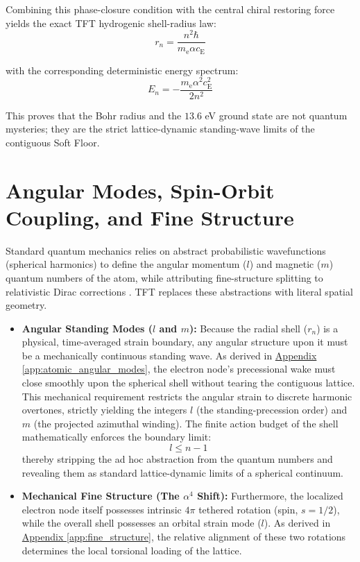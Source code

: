 Combining this phase-closure condition with the central chiral restoring force yields the exact TFT hydrogenic shell-radius law:
\begin{equation}
    r_n = \frac{n^2 \hbar}{m_{\mathrm{e}} \alpha c_{\mathrm{E}}}
\end{equation}

with the corresponding deterministic energy spectrum:
\begin{equation}
    E_n = -\frac{m_{\mathrm{e}} \alpha^2 c_{\mathrm{E}}^2}{2n^2}
\end{equation}

This proves that the Bohr radius and the $13.6$ eV ground state are not quantum mysteries; they are the strict lattice-dynamic standing-wave limits of the contiguous Soft Floor.

\section{Angular Modes, Spin-Orbit Coupling, and Fine Structure}
Standard quantum mechanics relies on abstract probabilistic wavefunctions (spherical harmonics) to define the angular momentum ($l$) and magnetic ($m$) quantum numbers of the atom, while attributing fine-structure splitting to relativistic Dirac corrections \cite{Dirac_1928}. TFT replaces these abstractions with literal spatial geometry.

\begin{itemize}
    \item \textbf{Angular Standing Modes ($l$ and $m$):} Because the radial shell ($r_n$) is a physical, time-averaged strain boundary, any angular structure upon it must be a mechanically continuous standing wave. As derived in \hyperref[app:atomic_angular_modes]{Appendix \ref*{app:atomic_angular_modes}}, the electron node's precessional wake must close smoothly upon the spherical shell without tearing the contiguous lattice. This mechanical requirement restricts the angular strain to discrete harmonic overtones, strictly yielding the integers $l$ (the standing-precession order) and $m$ (the projected azimuthal winding). The finite action budget of the shell mathematically enforces the boundary limit:
    \begin{equation}
        l \le n-1
    \end{equation}
    thereby stripping the ad hoc abstraction from the quantum numbers and revealing them as standard lattice-dynamic limits of a spherical continuum.
    
    \item \textbf{Mechanical Fine Structure (The $\alpha^4$ Shift):} Furthermore, the localized electron node itself possesses intrinsic $4\pi$ tethered rotation (spin, $s=1/2$), while the overall shell possesses an orbital strain mode ($l$). As derived in \hyperref[app:fine_structure]{Appendix \ref*{app:fine_structure}}, the relative alignment of these two rotations determines the local torsional loading of the lattice.
\end{itemize}

